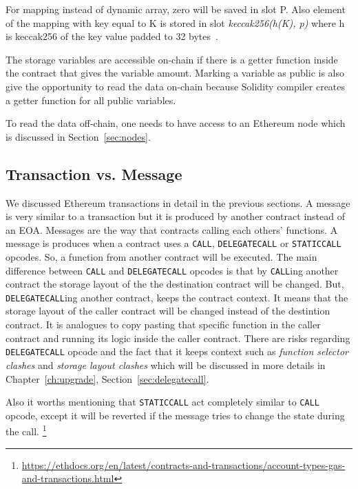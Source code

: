 For mapping instead of dynamic array, zero will be saved in slot P. Also element of the mapping with key equal to K is stored in slot \textit{keccak256(h(K), p)} where h is keccak256 of the key value padded to 32 bytes~\cite{wood2014ethereum}.

The storage variables are accessible on-chain if there is a getter function inside the contract that gives the variable amount. Marking a variable as public is also give the opportunity to read the data on-chain because Solidity compiler creates a getter function for all public variables. 

To read the data off-chain, one needs to have access to an Ethereum node which is discussed in Section~\ref{sec:nodes}.


\subsection{Transaction vs. Message}\label{sec:txVsMsg}
We discussed Ethereum transactions in detail in the previous sections. A message is very similar to a transaction but it is produced by another contract instead of an EOA. Messages are the way that contracts calling each others' functions. A message is produces when a contract uses a \texttt{CALL}, \texttt{DELEGATECALL} or \texttt{STATICCALL} opcodes. So, a function from another contract will be executed. The main difference between \texttt{CALL} and \texttt{DELEGATECALL} opcodes is that by \texttt{CALL}ing another contract the storage layout of the the destination contract will be changed. But, \texttt{DELEGATECALL}ing another contract, keeps the contract context. It means that the storage layout of the caller contract will be changed instead of the destintion contract. It is analogues to copy pasting that specific function in the caller contract and running its logic inside the caller contract. There are risks regarding \texttt{DELEGATECALL} opcode and the fact that it keeps context such as \textit{function selector clashes} and \textit{storage layout clashes} which will be discussed in more details in Chapter~\ref{ch:upgrade}, Section~\ref{sec:delegatecall}.

Also it worths mentioning that \texttt{STATICCALL} act completely similar to \texttt{CALL} opcode, except it will be reverted if the message tries to change the state during the call. 
\footnote{\url{https://ethdocs.org/en/latest/contracts-and-transactions/account-types-gas-and-transactions.html}}



